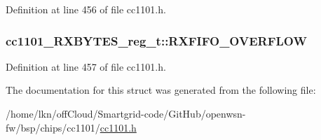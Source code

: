 Definition at line 456 of file cc1101.\+h.

\subsubsection[{\texorpdfstring{R\+X\+F\+I\+F\+O\+\_\+\+O\+V\+E\+R\+F\+L\+OW}{RXFIFO_OVERFLOW}}]{ cc1101\+\_\+\+R\+X\+B\+Y\+T\+E\+S\+\_\+reg\+\_\+t\+::\+R\+X\+F\+I\+F\+O\+\_\+\+O\+V\+E\+R\+F\+L\+OW}\hypertarget{structcc1101___r_x_b_y_t_e_s__reg__t_a080a27024abd26eae3f6e0dc8ae0da1c}{}\label{structcc1101___r_x_b_y_t_e_s__reg__t_a080a27024abd26eae3f6e0dc8ae0da1c}


Definition at line 457 of file cc1101.\+h.



The documentation for this struct was generated from the following file\+:\begin{DoxyCompactItemize}
\item 
/home/lkn/off\+Cloud/\+Smartgrid-\/code/\+Git\+Hub/openwsn-\/fw/bsp/chips/cc1101/\hyperlink{cc1101_8h}{cc1101.\+h}\end{DoxyCompactItemize}
